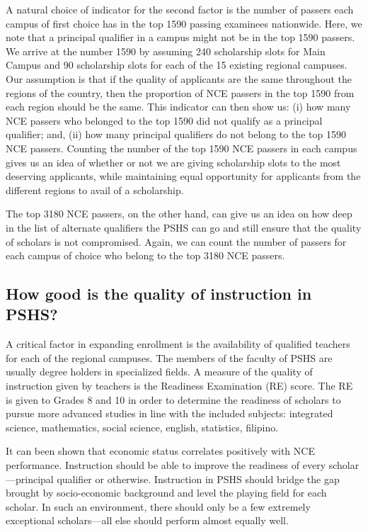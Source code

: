 \documentclass[]{article}
\begin{document}
A natural choice of indicator for the second factor is the number of
passers each campus of first choice has in the top 1590 passing
examinees nationwide. Here, we note that a principal qualifier in a
campus might not be in the top 1590 passers. We arrive at the number
1590 by assuming 240 scholarship slots for Main Campus and 90
scholarship slots for each of the 15 existing regional campuses. Our
assumption is that if the quality of applicants are the same throughout
the regions of the country, then the proportion of NCE passers in the
top 1590 from each region should be the same. This indicator can then
show us: (i) how many NCE passers who belonged to the top 1590 did not
qualify as a principal qualifier; and, (ii) how many principal
qualifiers do not belong to the top 1590 NCE passers. Counting the
number of the top 1590 NCE passers in each campus gives us an idea of
whether or not we are giving scholarship slots to the most deserving
applicants, while maintaining equal opportunity for applicants from the
different regions to avail of a scholarship.

The top 3180 NCE passers, on the other hand, can give us an idea on how
deep in the list of alternate qualifiers the PSHS can go and still
ensure that the quality of scholars is not compromised. Again, we can
count the number of passers for each campus of choice who belong to the
top 3180 NCE passers.

\hypertarget{how-good-is-the-quality-of-instruction-in-pshs}{%
\subsection{How good is the quality of instruction in
PSHS?}\label{how-good-is-the-quality-of-instruction-in-pshs}}

A critical factor in expanding enrollment is the availability of
qualified teachers for each of the regional campuses. The members of the
faculty of PSHS are usually degree holders in specialized fields. A
measure of the quality of instruction given by teachers is the Readiness
Examination (RE) score. The RE is given to Grades 8 and 10 in order to
determine the readiness of scholars to pursue more advanced studies in
line with the included subjects: integrated science, mathematics, social
science, english, statistics, filipino.

It can been shown that economic status correlates positively with NCE
performance. Instruction should be able to improve the readiness of
every scholar---principal qualifier or otherwise. Instruction in PSHS
should bridge the gap brought by socio-economic background and level the
playing field for each scholar. In such an environment, there should
only be a few extremely exceptional scholars---all else should perform
almost equally well.
\end{document}
